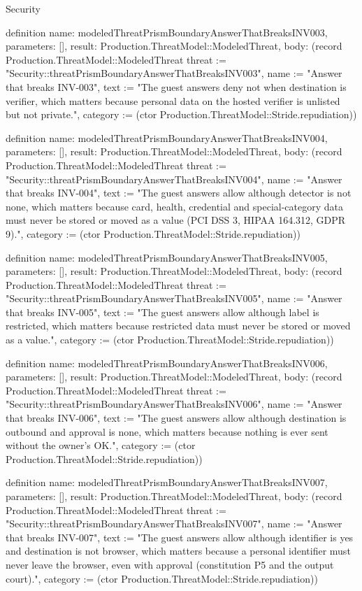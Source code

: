 \begin{lexlean}{Security}
\begin{semanticmodule}
definition{
  name: modeledThreatPrismBoundaryAnswerThatBreaksINV003,
  parameters: [],
  result: Production.ThreatModel::ModeledThreat,
  body: (record Production.ThreatModel::ModeledThreat {threat := "Security::threatPrismBoundaryAnswerThatBreaksINV003", name := "Answer that breaks INV-003", text := "The guest answers deny not when destination is verifier, which matters because personal data on the hosted verifier is unlisted but not private.", category := (ctor Production.ThreatModel::Stride.repudiation)})
}

definition{
  name: modeledThreatPrismBoundaryAnswerThatBreaksINV004,
  parameters: [],
  result: Production.ThreatModel::ModeledThreat,
  body: (record Production.ThreatModel::ModeledThreat {threat := "Security::threatPrismBoundaryAnswerThatBreaksINV004", name := "Answer that breaks INV-004", text := "The guest answers allow although detector is not none, which matters because card, health, credential and special-category data must never be stored or moved as a value (PCI DSS 3, HIPAA 164.312, GDPR 9).", category := (ctor Production.ThreatModel::Stride.repudiation)})
}

definition{
  name: modeledThreatPrismBoundaryAnswerThatBreaksINV005,
  parameters: [],
  result: Production.ThreatModel::ModeledThreat,
  body: (record Production.ThreatModel::ModeledThreat {threat := "Security::threatPrismBoundaryAnswerThatBreaksINV005", name := "Answer that breaks INV-005", text := "The guest answers allow although label is restricted, which matters because restricted data must never be stored or moved as a value.", category := (ctor Production.ThreatModel::Stride.repudiation)})
}

definition{
  name: modeledThreatPrismBoundaryAnswerThatBreaksINV006,
  parameters: [],
  result: Production.ThreatModel::ModeledThreat,
  body: (record Production.ThreatModel::ModeledThreat {threat := "Security::threatPrismBoundaryAnswerThatBreaksINV006", name := "Answer that breaks INV-006", text := "The guest answers allow although destination is outbound and approval is none, which matters because nothing is ever sent without the owner's OK.", category := (ctor Production.ThreatModel::Stride.repudiation)})
}

definition{
  name: modeledThreatPrismBoundaryAnswerThatBreaksINV007,
  parameters: [],
  result: Production.ThreatModel::ModeledThreat,
  body: (record Production.ThreatModel::ModeledThreat {threat := "Security::threatPrismBoundaryAnswerThatBreaksINV007", name := "Answer that breaks INV-007", text := "The guest answers allow although identifier is yes and destination is not browser, which matters because a personal identifier must never leave the browser, even with approval (constitution P5 and the output court).", category := (ctor Production.ThreatModel::Stride.repudiation)})
}


\end{semanticmodule}
\end{lexlean}
